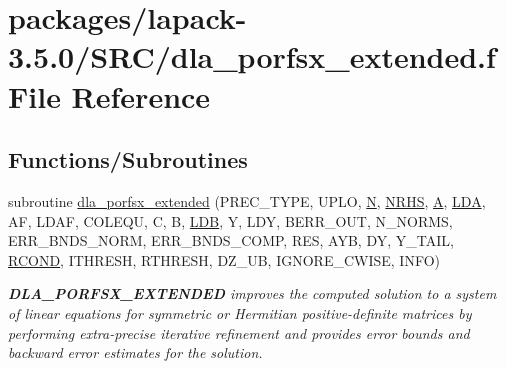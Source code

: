 \hypertarget{dla__porfsx__extended_8f}{}\section{packages/lapack-\/3.5.0/\+S\+R\+C/dla\+\_\+porfsx\+\_\+extended.f File Reference}
\label{dla__porfsx__extended_8f}
\subsection*{Functions/\+Subroutines}
\begin{DoxyCompactItemize}
\item 
subroutine \hyperlink{group__doublePOcomputational_ga1f04f8900d0a841afb32c0b60535ff7b}{dla\+\_\+porfsx\+\_\+extended} (P\+R\+E\+C\+\_\+\+T\+Y\+P\+E, U\+P\+L\+O, \hyperlink{polmisc_8c_a0240ac851181b84ac374872dc5434ee4}{N}, \hyperlink{example__user_8c_aa0138da002ce2a90360df2f521eb3198}{N\+R\+H\+S}, \hyperlink{classA}{A}, \hyperlink{example__user_8c_ae946da542ce0db94dced19b2ecefd1aa}{L\+D\+A}, A\+F, L\+D\+A\+F, C\+O\+L\+E\+Q\+U, C, B, \hyperlink{example__user_8c_a50e90a7104df172b5a89a06c47fcca04}{L\+D\+B}, Y, L\+D\+Y, B\+E\+R\+R\+\_\+\+O\+U\+T, N\+\_\+\+N\+O\+R\+M\+S, E\+R\+R\+\_\+\+B\+N\+D\+S\+\_\+\+N\+O\+R\+M, E\+R\+R\+\_\+\+B\+N\+D\+S\+\_\+\+C\+O\+M\+P, R\+E\+S, A\+Y\+B, D\+Y, Y\+\_\+\+T\+A\+I\+L, \hyperlink{superlu__enum__consts_8h_af00a42ecad444bbda75cde1b64bd7e72a9b5c151728d8512307565994c89919d5}{R\+C\+O\+N\+D}, I\+T\+H\+R\+E\+S\+H, R\+T\+H\+R\+E\+S\+H, D\+Z\+\_\+\+U\+B, I\+G\+N\+O\+R\+E\+\_\+\+C\+W\+I\+S\+E, I\+N\+F\+O)
\begin{DoxyCompactList}\small\item\em {\bfseries D\+L\+A\+\_\+\+P\+O\+R\+F\+S\+X\+\_\+\+E\+X\+T\+E\+N\+D\+E\+D} improves the computed solution to a system of linear equations for symmetric or Hermitian positive-\/definite matrices by performing extra-\/precise iterative refinement and provides error bounds and backward error estimates for the solution. \end{DoxyCompactList}\end{DoxyCompactItemize}
